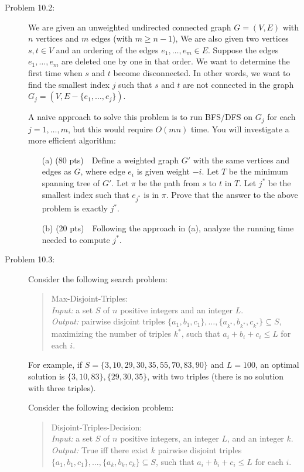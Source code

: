 \documentclass[11pt]{article}
\begin{document}
\begin{description}
\newpage
\item[Problem 10.2:] 
We are given an unweighted undirected connected graph $G=(V,E)$ with $n$ vertices and $m$ edges (with $m\ge n-1$),
We are also given two vertices $s,t\in V$ and an ordering of the edges $e_1,\ldots,e_m\in E$.  Suppose the edges $e_1,\ldots,e_m$ are deleted one by one in that order.
We want to determine the first time when $s$ and $t$ become disconnected.
In other words, we want to find the smallest index $j$ such that $s$ and $t$ are not connected in the graph $G_j=(V,E-\{e_1,\ldots,e_j\})$.

A naive approach to solve this problem is to run BFS/DFS on $G_j$ for each $j=1,\ldots,m$, but this
would require $O(mn)$ time.
You will investigate a more efficient algorithm:

\begin{enumerate}
\item[(a)] (80 pts)\ \ Define a weighted graph $G'$ with the same vertices and edges as $G$, where
edge $e_i$ is given weight $-i$.  Let $T$ be the minimum spanning tree of $G'$.
Let $\pi$ be the path from $s$ to $t$ in $T$.
Let $j^*$ be the smallest index such that $e_{j^*}$ is in $\pi$.
Prove that the answer to the above problem is exactly $j^*$.

\item[(b)] (20 pts)\ \ Following the approach in (a), analyze the running time needed to compute $j^*$.
\end{enumerate}



\bigskip
\item[Problem 10.3:] 
Consider the following search problem:
\begin{quote}
{\sc Max-Disjoint-Triples}:\\[2pt]
\emph{Input:} a set $S$ of $n$ positive integers and an integer $L$.\\[2pt]
\emph{Output:} pairwise disjoint triples $\{a_1,b_1,c_1\},\ldots,\{a_{k^*},b_{k^*},c_{k^*}\}\subseteq S$,
maximizing the number of triples $k^*$, such that $a_i+b_i+c_i\le L$ for each $i$.
\end{quote}
For example, if $S=\{3,10,29,30,35,55,70,83,90\}$ and $L=100$, an optimal solution is 
$\{3,10,83\},\{29,30,35\}$, with two triples (there is no solution with three triples).

Consider the following decision problem:
\begin{quote}
{\sc Disjoint-Triples-Decision}:\\[2pt]
\emph{Input:} a set $S$ of $n$ positive integers, an integer $L$, and
an integer $k$.\\[2pt]
\emph{Output:} True iff there exist $k$ pairwise disjoint triples $\{a_1,b_1,c_1\},\ldots, \{a_k,b_k,c_k\} \subseteq S$, such that $a_i+b_i+c_i\le L$ for each $i$.
\end{quote}


\end{description}
\end{document}
